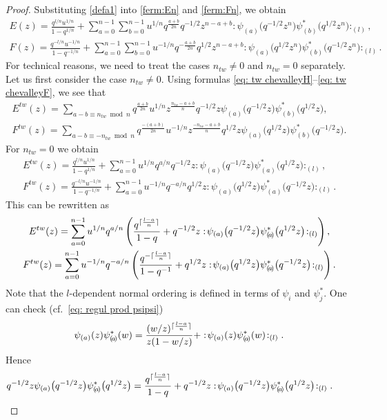 \documentclass[11pt]{article}
\numberwithin{equation}{section}
\theoremstyle{definition}
\DeclarePairedDelimiter\ceil{\lceil}{\rceil}
\newcommand{\psia}{\psi_{({a})}}
\newcommand{\psiaa}{\psi^*_{( \! a \! )}}
\newcommand{\psib}{\psi^*_{( b )}}
\begin{document}
\begin{proof}
Substituting \eqref{defa1} into \eqref{ferm:En} and \eqref{ferm:Fn}, we obtain
\begin{gather*}
E(z) = \frac{q^{l/n} u^{1/n} }{1-q^{1/n}} + \sum_{a=0}^{n-1} \sum_{b=0}^{n-1} u^{1/n} q^{\frac{a+b}{2n}} q^{-1/2} z^{n-a+b} : \! \psia \big( q^{-1/2} z^n\big) \psib \big(q^{1/2} z^n\big) \! :_{(l)}, \\
F(z) = \frac{q^{-l/n} u^{-1/n} }{1-q^{-1/n}} + \sum_{a=0}^{n-1} \sum_{b=0}^{n-1} u^{-1/n} q^{- \frac{a+b}{2n}} q^{1/2} z^{n-a+b} : \! \psia \big( q^{1/2} z^n \big) \psib \big(q^{-1/2} z^n \big)\!:_{(l)}.
\end{gather*}
For technical reasons, we need to treat the cases $n_{tw} \neq 0$ and $n_{tw} =0$ separately. Let us first consider the case $n_{tw} \neq 0$. Using formulas \eqref{eq: tw chevalleyH}--\eqref{eq: tw chevalleyF}, we see that
\begin{gather*}
E^{tw}(z) = \sum_{a-b \equiv n_{tw} \bmod n} \! \! q^{\frac{a+b}{2n}} u^{1/n} z^{\frac{n_{tw}-a+b}{n}} q^{-1/2} z \psia \big( q^{-1/2} z\big) \psib \big(q^{1/2} z\big), \\
F^{tw} (z) = \sum_{a-b \equiv -n_{tw} \bmod n} \! \!q^{\frac{-(a+b)}{2n}} u^{-1/n} z^{\frac{-n_{tw}-a+b}{n}} q^{1/2} z \psia \big( q^{1/2} z \big) \psib \big(q^{-1/2} z \big) .
\end{gather*}
For $n_{tw}=0$ we obtain
\begin{gather*}
E^{tw}(z) = \frac{q^{l/n} u^{1/n} }{1-q^{1/n}} + \sum_{a=0}^{n-1} u^{1/n} q^{a/n} q^{-1/2} z : \! \psia \big( q^{-1/2} z\big) \psiaa \big(q^{1/2} z\big) \! :_{(l)}, \\
F^{tw}(z) = \frac{q^{-l/n} u^{-1/n} }{1-q^{-1/n}} + \sum_{a=0}^{n-1} u^{-1/n} q^{-a/n} q^{1/2} z : \! \psia \big( q^{1/2} z \big) \psiaa \big(q^{-1/2} z \big)\!:_{(l)}.
\end{gather*}
This can be rewritten as
\begin{gather*}
E^{tw}(z) = \sum_{a=0}^{n-1} u^{1/n} q^{a/n} \left( \frac{q^{ \ceil{\frac{l-a}{n}} }}{1-q} +q^{-1/2} z : \! \psia \big( q^{-1/2} z\big) \psiaa \big(q^{1/2} z\big) \! :_{(l)} \right), \\
F^{tw}(z) = \sum_{a=0}^{n-1} u^{-1/n} q^{-a/n} \left( \frac{q^{- \ceil{\frac{l-a}{n}} }}{1-q^{-1}} + q^{1/2} z : \! \psia \big( q^{1/2} z \big) \psiaa \big(q^{-1/2} z \big)\!:_{(l)} \right) .
\end{gather*}
Note that the $l$-dependent normal ordering is defined in terms of $\psi_i$ and $\psi^*_j$. One can check (cf.~\eqref{eq: regul prod psipsi})
\begin{align} \label{eq: psia OPE}
\psia(z) \psiaa(w) = \frac{(w/z)^{\ceil{\frac{l-a}{n}} }}{z(1-w/z)} + : \! \psia (z) \psiaa (w) \! :_{(l)}.
\end{align}
Hence
\begin{equation*}
q^{-1/2} z \psia\big(q^{-1/2}z\big) \psiaa\big(q^{1/2}z\big) = \frac{q^{\ceil{\frac{l-a}{n}} }}{1-q} + q^{-1/2} z : \! \psia \big(q^{-1/2}z\big) \psiaa \big(q^{1/2}z\big) \! :_{(l)}.\tag*{\qed}
\end{equation*}\renewcommand{\qed}{}
\end{proof}
\end{document}
